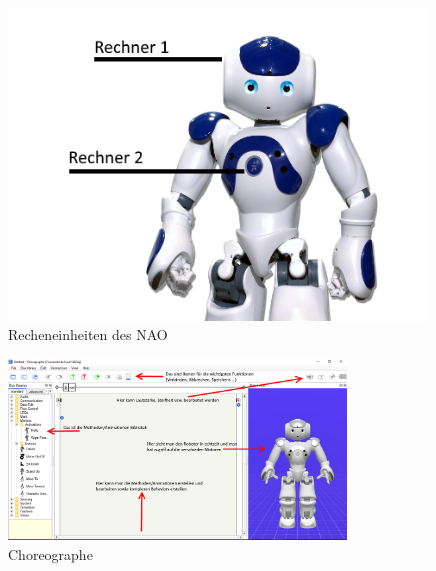 \begin{appendix}
        \begin{figure}[ht]
            \centering
            \includegraphics[width=0.99\textwidth]{src/pictures/nao-computers.png}
            \caption{Recheneinheiten des NAO}
            \label{img:nao:computers}
        \end{figure}

        \begin{figure}[ht]
            \centering
            \includegraphics[angle=90, width=0.80\textwidth]{src/pictures/nao-choreo-welcome.png}
            \caption{Choreographe}
            \label{img:nao:choreo:welcome}
        \end{figure}


\end{appendix}
